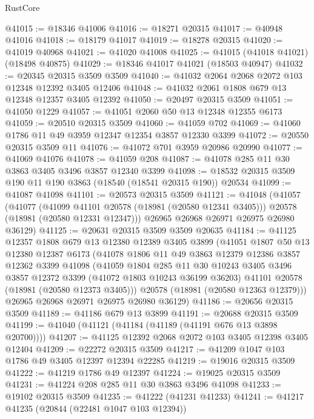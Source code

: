 \begin{lexlean}{RustCore}
\begin{coremodule}
@41015 := @18346 @41006
@41016 := @18271 @20315
@41017 := @40948 @41016
@41018 := @18179 @41017
@41019 := @18278 @20315
@41020 := @41019 @40968
@41021 := @41020 @41008
@41025 := @41015 (@41018 @41021) (@18498 @40875)
@41029 := @18346 @41017 @41021 (@18503 @40947)
@41032 := @20345 @20315 @3509 @3509
@41040 := @41032 @2064 @2068 @2072 @103 @12348 @12392 @3405 @12406
@41048 := @41032 @2061 @1808 @679 @13 @12348 @12357 @3405 @12392
@41050 := @20497 @20315 @3509
@41051 := @41050 @1229
@41057 := @41051 @2060 @50 @13 @12348 @12355 @6173
@41059 := @20510 @20315 @3509
@41060 := @41059 @702
@41069 := @41060 @1786 @11 @49 @3959 @12347 @12354 @3857 @12330 @3399
@41072 := @20550 @20315 @3509 @11
@41076 := @41072 @701 @3959 @20986 @20990
@41077 := @41069 @41076
@41078 := @41059 @208
@41087 := @41078 @285 @11 @30 @3863 @3405 @3496 @3857 @12340 @3399
@41098 := @18532 @20315 @3509 @190 @11 @190 @3863 (@18540 (@18541 @20315 @190)) @20534
@41099 := @41087 @41098
@41101 := @20573 @20315 @3509
@41121 := @41048
    (@41057
      (@41077
        (@41099 @41101 @20578 (@18981 (@20580 @12341 @3405)))
        @20578
        (@18981 (@20580 @12331 @12347)))
      @26965
      @26968
      @26971
      @26975
      @26980
      @36129)
@41125 := @20631 @20315 @3509 @3509 @20635
@41184 := @41125
    @12357
    @1808
    @679
    @13
    @12380
    @12389
    @3405
    @3899
    (@41051
      @1807
      @50
      @13
      @12380
      @12387
      @6173
      (@41078
        @1806
        @11
        @49
        @3863
        @12379
        @12386
        @3857
        @12362
        @3399
        @41098
        (@41059
          @1804
          @285
          @11
          @30
          @10243
          @3405
          @3496
          @3857
          @12372
          @3399
          (@41072 @1803 @10243 @36199 @36203)
          @41101
          @20578
          (@18981 (@20580 @12373 @3405)))
        @20578
        (@18981 (@20580 @12363 @12379)))
      @26965
      @26968
      @26971
      @26975
      @26980
      @36129)
@41186 := @20656 @20315 @3509
@41189 := @41186 @679 @13 @3899
@41191 := @20688 @20315 @3509
@41199 := @41040 (@41121 (@41184 (@41189 (@41191 @676 @13 @3898 @20700))))
@41207 := @41125 @12392 @2068 @2072 @103 @3405 @12398 @3405 @12404
@41209 := @22272 @20315 @3509
@41217 := @41209 @1047 @103 @1786 @49 @3405 @12397 @12394 @22285
@41219 := @19016 @20315 @3509
@41222 := @41219 @1786 @49 @12397
@41224 := @19025 @20315 @3509
@41231 := @41224 @208 @285 @11 @30 @3863 @3496 @41098
@41233 := @19102 @20315 @3509
@41235 := @41222 (@41231 @41233)
@41241 := @41217 @41235 (@20844 (@22481 @1047 @103 @12394))

\end{coremodule}
\end{lexlean}
